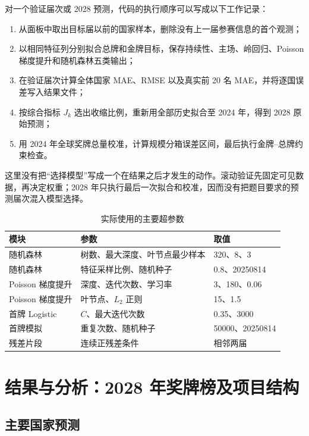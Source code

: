 \documentclass[UTF8,11pt,a4paper]{ctexart}
\begin{document}
对一个验证届次或 2028 预测，代码的执行顺序可以写成以下工作记录：
\begin{enumerate}[label=步骤\arabic*：,leftmargin=4em]
\item 从面板中取出目标届以前的国家样本，删除没有上一届参赛信息的首个观测；
\item 以相同特征列分别拟合总牌和金牌目标，保存持续性、主场、岭回归、Poisson 梯度提升和随机森林五类输出；
\item 在验证届次计算全体国家 MAE、RMSE 以及真实前 20 名 MAE，并将逐国误差写入结果文件；
\item 按综合指标 $J_k$ 选出收缩比例，重新用全部历史拟合至 2024 年，得到 2028 原始预测；
\item 用 2024 年全球奖牌总量校准，计算规模分箱误差区间，最后执行金牌--总牌约束检查。
\end{enumerate}
这里没有把“选择模型”写成一个在结果之后才发生的动作。滚动验证先固定可见数据，再决定权重；2028 年只执行最后一次拟合和校准，因而没有把题目要求的预测届次混入模型选择。

\begin{table}[H]
\centering
\caption{实际使用的主要超参数}
\label{tab:hyperparameters}
\small
\begin{tabular}{lll}
\toprule
模块 & 参数 & 取值\\
\midrule
随机森林 & 树数、最大深度、叶节点最少样本 & 320、8、3\\
随机森林 & 特征采样比例、随机种子 & 0.8、20250814\\
Poisson 梯度提升 & 深度、迭代次数、学习率 & 3、180、0.06\\
Poisson 梯度提升 & 叶节点、$L_2$ 正则 & 15、1.5\\
首牌 Logistic & $C$、最大迭代次数 & 0.35、3000\\
首牌模拟 & 重复次数、随机种子 & 50000、20250814\\
残差片段 & 连续正残差条件 & 相邻两届\\
\bottomrule
\end{tabular}
\end{table}

\section{结果与分析：2028 年奖牌榜及项目结构}

\subsection{主要国家预测}
\end{document}
